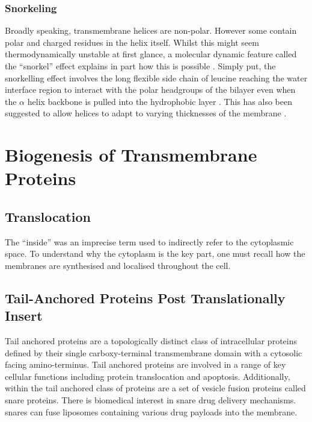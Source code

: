 \subsubsection{Snorkeling}

Broadly speaking, transmembrane helices are non-polar. However some contain polar and  charged residues in the helix itself. Whilst this might seem thermodynamically unstable at first glance, a molecular dynamic feature called the ``snorkel'' effect explains in part how this is possible \cite{Chamberlain2004, Strandberg2003}. Simply put, the snorkelling effect involves the long flexible side chain of leucine reaching the water interface region to interact with the polar headgroups of the bilayer even when the $\alpha$ helix backbone is pulled into the hydrophobic layer \cite{Krishnakumar2007}. This has also been suggested to allow helices to adapt to varying thicknesses of the membrane \cite{Kandasamy2006}.

\section{Biogenesis of Transmembrane Proteins}
\subsection{Translocation}
The ``inside'' was an imprecise term used to indirectly refer to the cytoplasmic space. To understand why the cytoplasm is the key part, one must recall how the membranes are synthesised and localised throughout the cell.

\subsection{Tail-Anchored Proteins Post Translationally Insert}

Tail anchored proteins are a topologically distinct class of intracellular proteins defined by their single carboxy-terminal transmembrane domain with a cytosolic facing amino-terminus. Tail anchored proteins are involved in a range of key cellular functions including protein translocation and apoptosis. Additionally, within the tail anchored class of proteins are a set of vesicle fusion proteins called \gls{snare} proteins. There is biomedical interest in \gls{snare} drug delivery mechanisms. \gls{snare}s can fuse liposomes containing various drug payloads into the membrane.

